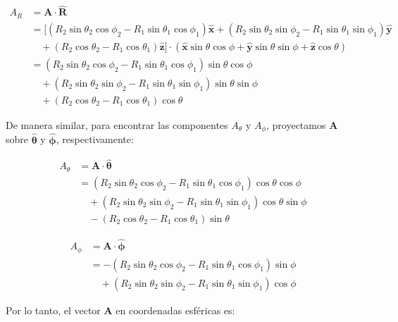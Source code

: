 \documentclass{book}
\begin{document}
\begin{align*}
A_R &= \mathbf{A} \cdot \mathbf{\hat{R}} \\
&= [(R_2 \sin \theta_2 \cos \phi_2 - R_1 \sin \theta_1 \cos \phi_1) \mathbf{\hat{x}} + (R_2 \sin \theta_2 \sin \phi_2 - R_1 \sin \theta_1 \sin \phi_1) \mathbf{\hat{y}} \\
&\quad + (R_2 \cos \theta_2 - R_1 \cos \theta_1) \mathbf{\hat{z}}] \cdot (\mathbf{\hat{x}} \sin \theta \cos \phi + \mathbf{\hat{y}} \sin \theta \sin \phi + \mathbf{\hat{z}} \cos \theta) \\
&= (R_2 \sin \theta_2 \cos \phi_2 - R_1 \sin \theta_1 \cos \phi_1) \sin \theta \cos \phi \\
&\quad + (R_2 \sin \theta_2 \sin \phi_2 - R_1 \sin \theta_1 \sin \phi_1) \sin \theta \sin \phi \\
&\quad + (R_2 \cos \theta_2 - R_1 \cos \theta_1) \cos \theta
\end{align*}

De manera similar, para encontrar las componentes $A_{\theta}$ y $A_{\phi}$, proyectamos $\mathbf{A}$ sobre $\mathbf{\hat{\theta}}$ y $\mathbf{\hat{\phi}}$, respectivamente:

\begin{align*}
A_{\theta} &= \mathbf{A} \cdot \mathbf{\hat{\theta}} \\
&= (R_2 \sin \theta_2 \cos \phi_2 - R_1 \sin \theta_1 \cos \phi_1) \cos \theta \cos \phi \\
&\quad + (R_2 \sin \theta_2 \sin \phi_2 - R_1 \sin \theta_1 \sin \phi_1) \cos \theta \sin \phi \\
&\quad - (R_2 \cos \theta_2 - R_1 \cos \theta_1) \sin \theta
\end{align*}

\begin{align*}
A_{\phi} &= \mathbf{A} \cdot \mathbf{\hat{\phi}} \\
&= -(R_2 \sin \theta_2 \cos \phi_2 - R_1 \sin \theta_1 \cos \phi_1) \sin \phi \\
&\quad + (R_2 \sin \theta_2 \sin \phi_2 - R_1 \sin \theta_1 \sin \phi_1) \cos \phi
\end{align*}

Por lo tanto, el vector $\mathbf{A}$ en coordenadas esféricas es:
\end{document}
